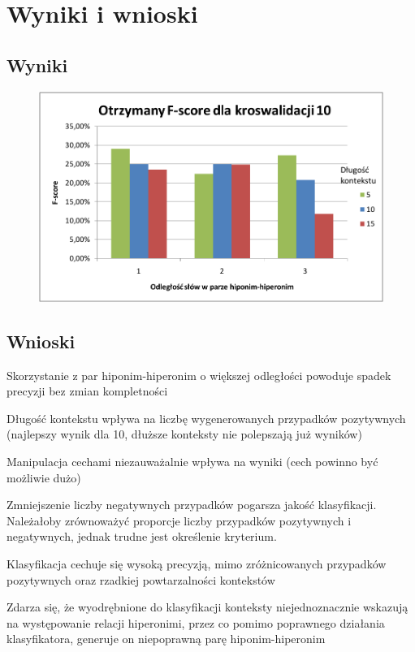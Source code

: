 \documentclass[a4paper,10pt]{report}
\begin{document}
\chapter{Wyniki i wnioski}

\section{Wyniki}

\begin{figure}[h]
\centering
 \includegraphics[width=13cm]{img/image003.png}
 \caption{}
\label{fig:wykres}
\end{figure} 

\section{Wnioski}

Skorzystanie z par hiponim-hiperonim o większej odległości powoduje spadek precyzji bez zmian kompletności

Długość kontekstu wpływa na liczbę wygenerowanych przypadków pozytywnych (najlepszy wynik dla 10, dłuższe konteksty nie polepszają już wyników)

Manipulacja cechami niezauważalnie wpływa na wyniki (cech powinno być możliwie dużo)

Zmniejszenie liczby negatywnych przypadków pogarsza jakość klasyfikacji. Należałoby zrównoważyć proporcje liczby przypadków pozytywnych i negatywnych, jednak trudne jest określenie kryterium.


Klasyfikacja cechuje się wysoką precyzją, mimo zróżnicowanych przypadków pozytywnych oraz rzadkiej powtarzalności kontekstów

Zdarza się, że wyodrębnione do klasyfikacji konteksty niejednoznacznie wskazują na występowanie relacji hiperonimi, przez co pomimo poprawnego działania klasyfikatora, generuje on niepoprawną parę hiponim-hiperonim
\end{document}
